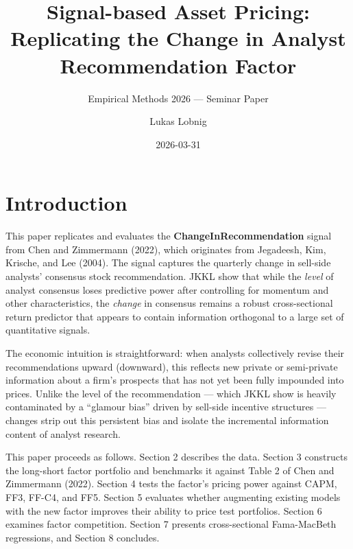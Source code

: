 \documentclass[
  letterpaper,
  DIV=11,
  numbers=noendperiod]{scrartcl}
\title{Signal-based Asset Pricing: Replicating the Change in Analyst
Recommendation Factor}
\subtitle{Empirical Methods 2026 --- Seminar Paper}
\author{Lukas Lobnig}
\date{2026-03-31}
\renewcommand*\contentsname{Table of contents}
\newcommand\contentsname{Table of contents}
\begin{document}
\maketitle

\renewcommand*\contentsname{Table of contents}
{
\hypersetup{linkcolor=}
\setcounter{tocdepth}{3}
\tableofcontents
}
\section{Introduction}\label{introduction}

This paper replicates and evaluates the \textbf{ChangeInRecommendation}
signal from Chen and Zimmermann (2022), which originates from Jegadeesh,
Kim, Krische, and Lee (2004). The signal captures the quarterly change
in sell-side analysts' consensus stock recommendation. JKKL show that
while the \emph{level} of analyst consensus loses predictive power after
controlling for momentum and other characteristics, the \emph{change} in
consensus remains a robust cross-sectional return predictor that appears
to contain information orthogonal to a large set of quantitative
signals.

The economic intuition is straightforward: when analysts collectively
revise their recommendations upward (downward), this reflects new
private or semi-private information about a firm's prospects that has
not yet been fully impounded into prices. Unlike the level of the
recommendation --- which JKKL show is heavily contaminated by a
``glamour bias'' driven by sell-side incentive structures --- changes
strip out this persistent bias and isolate the incremental information
content of analyst research.

This paper proceeds as follows. Section 2 describes the data. Section 3
constructs the long-short factor portfolio and benchmarks it against
Table 2 of Chen and Zimmermann (2022). Section 4 tests the factor's
pricing power against CAPM, FF3, FF-C4, and FF5. Section 5 evaluates
whether augmenting existing models with the new factor improves their
ability to price test portfolios. Section 6 examines factor competition.
Section 7 presents cross-sectional Fama-MacBeth regressions, and Section
8 concludes.
\end{document}
